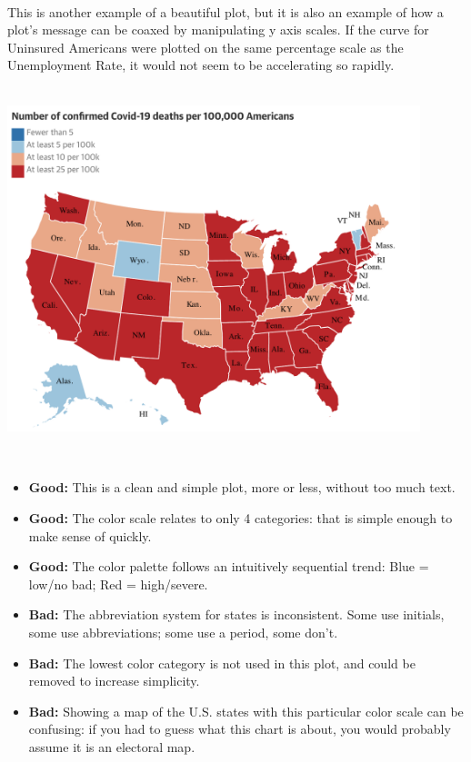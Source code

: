 \documentclass[]{book}
\providecommand{\tightlist}{%
  \setlength{\itemsep}{0pt}\setlength{\parskip}{0pt}}
\begin{document}
~

This is another example of a beautiful plot, but it is also an example of how a plot's message can be coaxed by manipulating y axis scales. If the curve for Uninsured Americans were plotted on the same percentage scale as the Unemployment Rate, it would not seem to be accelerating so rapidly.

~\\

\includegraphics[width=0.9\textwidth,height=\textheight]{img/visb.png}

~

\begin{itemize}
\tightlist
\item
  \textbf{Good:} This is a clean and simple plot, more or less, without too much text.
\item
  \textbf{Good:} The color scale relates to only 4 categories: that is simple enough to make sense of quickly.\\
\item
  \textbf{Good:} The color palette follows an intuitively sequential trend: Blue = low/no bad; Red = high/severe.
\item
  \textbf{Bad:} The abbreviation system for states is inconsistent. Some use initials, some use abbreviations; some use a period, some don't.\\
\item
  \textbf{Bad:} The lowest color category is not used in this plot, and could be removed to increase simplicity.\\
\item
  \textbf{Bad:} Showing a map of the U.S. states with this particular color scale can be confusing: if you had to guess what this chart is about, you would probably assume it is an electoral map.
\end{itemize}
\end{document}
